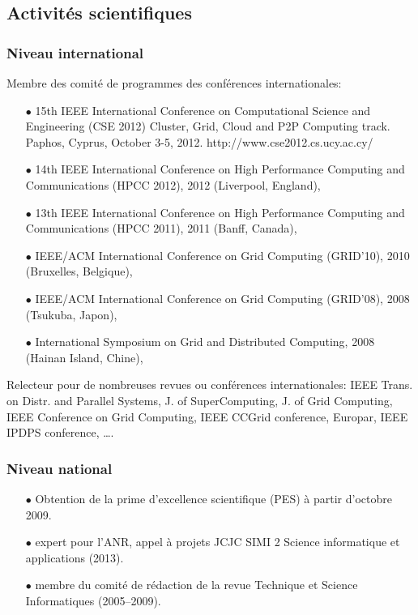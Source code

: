 \documentclass[11pt]{article}
\begin{document}
\subsection{Activités scientifiques}

\subsubsection{Niveau international}
Membre des comité de programmes des conférences internationales:\\[-3mm]
\begin{itemize}
\item[$\bullet$]
15th IEEE International Conference on Computational Science and Engineering (CSE 2012) 
Cluster, Grid, Cloud and P2P Computing track. Paphos, Cyprus, October 3-5, 2012. 
http://www.cse2012.cs.ucy.ac.cy/

\item[$\bullet$] 
14th IEEE International Conference on High Performance Computing and Communications (HPCC 2012), 
2012 (Liverpool, England),
\item[$\bullet$] 
13th IEEE International Conference on High Performance Computing and Communications (HPCC 2011), 
2011 (Banff, Canada),
\item[$\bullet$] 
IEEE/ACM International Conference on Grid Computing (GRID'10), 2010 (Bruxelles, Belgique),
\item[$\bullet$] 
IEEE/ACM International Conference on Grid Computing (GRID'08), 2008 (Tsukuba, Japon), 
\item [$\bullet$]
International Symposium on Grid and Distributed Computing, 2008 (Hainan Island, Chine),\\
\end{itemize}

Relecteur pour de nombreuses revues ou conférences internationales: IEEE Trans. on Distr. and Parallel Systems, 
J. of SuperComputing, J. of Grid Computing, IEEE Conference on Grid Computing, IEEE CCGrid conference, Europar,
IEEE IPDPS conference, \ldots.


\subsubsection{Niveau national}
\begin{itemize}


\item[$\bullet$] Obtention de la prime d'excellence scientifique (PES) à partir d'octobre 2009.\\

\item [$\bullet$]
expert pour l'ANR, appel à projets JCJC SIMI 2 Science informatique et applications (2013).\\

\item [$\bullet$]
membre du comité de rédaction de la revue Technique et Science Informatiques (2005--2009).\\
\end{itemize}
\end{document}
